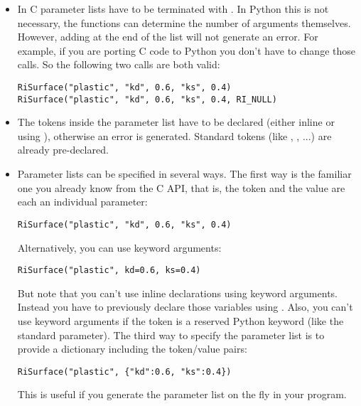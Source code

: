 \begin{itemize}
\item In C parameter lists have to be terminated with . In Python
this is not necessary, the functions can determine the number of
arguments themselves. However, adding  at the end of the list
will not generate an error. For example, if you are porting C code to
Python you don't have to change those calls. So the following two
calls are both valid:

\begin{verbatim}
RiSurface("plastic", "kd", 0.6, "ks", 0.4)
RiSurface("plastic", "kd", 0.6, "ks", 0.4, RI_NULL) 
\end{verbatim}

\item The tokens inside the parameter list have to be declared (either
inline or using ), otherwise an error is
generated. Standard tokens (like , , ...) are
already pre-declared.

\item Parameter lists can be specified in several ways. The first way is the
familiar one you already know from the C API, that is, the token and
the value are each an individual parameter:

\begin{verbatim}
RiSurface("plastic", "kd", 0.6, "ks", 0.4) 
\end{verbatim}

Alternatively, you can use keyword arguments: 

\begin{verbatim}
RiSurface("plastic", kd=0.6, ks=0.4) 
\end{verbatim}

But note that you can't use inline declarations using keyword
arguments. Instead you have to previously declare those variables
using . Also, you can't use keyword arguments if
the token is a reserved Python keyword (like the standard 
parameter).  The third way to specify the parameter list is to provide
a dictionary including the token/value pairs:

\begin{verbatim}
RiSurface("plastic", {"kd":0.6, "ks":0.4}) 
\end{verbatim}

This is useful if you generate the parameter list on the fly in your program.
\end{itemize}


